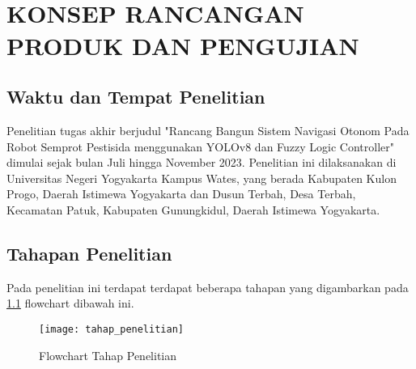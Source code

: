 
\chapter[KONSEP RANCANGAN / PRODUK / JASA / EVALUASI / PENGUJIAN]{\\ KONSEP RANCANGAN PRODUK DAN PENGUJIAN}

\section{Waktu dan Tempat Penelitian}
Penelitian tugas akhir berjudul "Rancang Bangun Sistem Navigasi Otonom Pada Robot Semprot Pestisida menggunakan YOLOv8 dan Fuzzy Logic Controller" dimulai sejak bulan Juli hingga November 2023. Penelitian ini dilaksanakan di Universitas Negeri Yogyakarta Kampus Wates, yang berada Kabupaten Kulon Progo, Daerah Istimewa Yogyakarta dan Dusun Terbah, Desa Terbah, Kecamatan Patuk, Kabupaten Gunungkidul, Daerah Istimewa Yogyakarta.

\section{Tahapan Penelitian}
Pada penelitian ini terdapat terdapat beberapa tahapan yang digambarkan pada  \cref{fig:flowchart} flowchart dibawah ini. 

\begin{figure}[H]
	\centering
	\texttt{[image: tahap\_penelitian]}
	\caption{Flowchart Tahap Penelitian}
	\label{fig:flowchart}
\end{figure}

